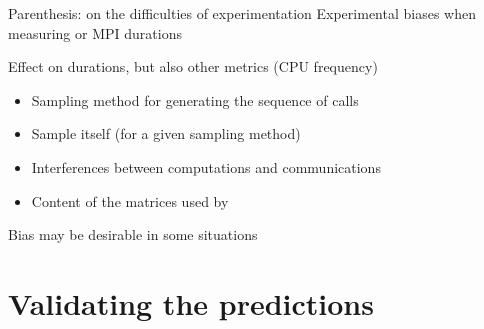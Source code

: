 \documentclass[10pt]{beamer}
\begin{document}
\begin{frame}{Parenthesis: on the difficulties of experimentation}
    \alert{Experimental biases} when measuring \dgemm or MPI durations

    Effect on durations, but also other metrics (\eg CPU frequency)
    \onslide<+->
    \begin{itemize}[<+->]
        \item Sampling method for generating the sequence of calls
        \item Sample itself (for a given sampling method)
        \item Interferences between computations and communications
        \item Content of the matrices used by \dgemm
    \end{itemize}

    \onslide<+->
    Bias may be desirable in some situations
\end{frame}


\section{Validating the predictions}
\end{document}
